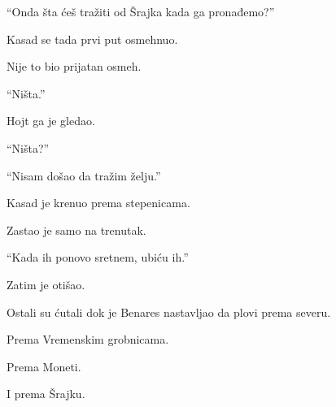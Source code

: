 ``Onda šta ćeš tražiti od Šrajka kada ga pronađemo?''

Kasad se tada prvi put osmehnuo.

Nije to bio prijatan osmeh.

``Ništa.''

Hojt ga je gledao.

``Ništa?''

``Nisam došao da tražim želju.''

Kasad je krenuo prema stepenicama.

Zastao je samo na trenutak.

``Kada ih ponovo sretnem, ubiću ih.''

Zatim je otišao.

Ostali su ćutali dok je Benares nastavljao da plovi prema severu.

Prema Vremenskim grobnicama.

Prema Moneti.

I prema Šrajku.
